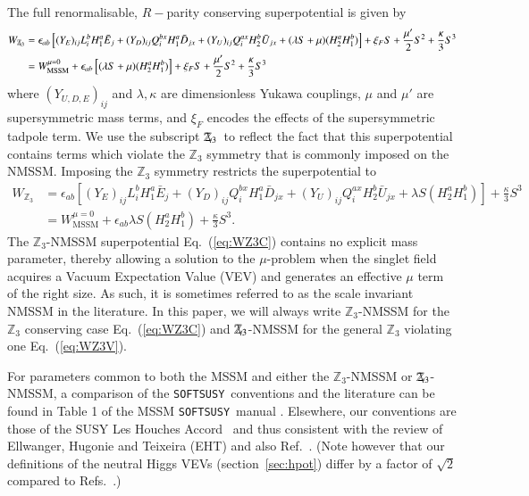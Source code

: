 \documentclass[final,3p,times]{elsarticle}
\def\SOFTSUSY{{\tt SOFTSUSY}}
\newcommand{\Zv}{\,\mathbf{\backslash}\mkern-11.0mu{\mathbb{Z}}_{3}} %
\begin{document}
The full renormalisable, $R-$parity conserving superpotential is given by
%
\begin{align} 
 W_{\Zv}  &=  \epsilon_{ab} \left[ (Y_E)_{ij} L_i^b H_1^a \bar{E}_{j} 
+ (Y_D)_{ij} Q_i^{bx} H_1^a \bar{D}_{jx} 
+ (Y_U)_{ij} Q_i^{ax} H_2^b \bar{U}_{jx} 
+ (\lambda S + \mu)(H^a_2 H^b_1) \right]  + \xi_FS 
+ \frac{\mu^\prime}{2} S^{2} + \frac{\kappa}{3}S^{3} \\
%
&= W_\mathrm{MSSM}^{\mu =0} 
+ \epsilon_{ab}\left[ (\lambda S + \mu)(H^a_2 H^b_1) \right]  
+ \xi_FS + \frac{\mu^\prime}{2}S^{2} + \frac{\kappa}{3} S^{3} \,
\label{eq:WZ3V}
\end{align}
%
\noindent where $(Y_{U,D,E})_{ij}$ and $\lambda,\kappa$ are dimensionless Yukawa 
couplings, $\mu$ and $\mu'$ are supersymmetric mass terms, and $\xi_F$ encodes 
the effects of the supersymmetric tadpole term.  We use
the subscript $\Zv$~to reflect the fact that this superpotential 
contains terms which violate the $\mathbb{Z}_3$ symmetry that is commonly 
imposed on the NMSSM.  Imposing the $\mathbb{Z}_3$ symmetry restricts the 
superpotential to
%
\begin{align} 
 W_{\mathbb{Z}_3} &= \epsilon_{ab} \left[(Y_E)_{ij} L_i^b H_1^a \bar{E}_{j} 
+ (Y_D)_{ij} Q_i^{bx} H_1^a \bar{D}_{jx} + (Y_U)_{ij} Q_i^{ax} H_2^b \bar{U}_{jx}  
+ \lambda S(H^a_2 H^b_1) \right] + \frac{\kappa}{3}S^{3} \\
%
&= W_\mathrm{MSSM}^{\mu =0}  + \epsilon_{ab} \lambda S (H^a_2 H^b_1) 
+ \frac{\kappa}{3}S^{3}.
\label{eq:WZ3C}
\end{align}
%
\noindent The $\mathbb{Z}_3$-NMSSM superpotential Eq.~(\ref{eq:WZ3C}) contains no 
explicit mass parameter, thereby allowing a solution to the $\mu$-problem when 
the singlet field acquires a Vacuum Expectation Value (VEV) and generates an 
effective $\mu$ term of the right size. As such, it is sometimes referred to as 
the scale invariant NMSSM in the literature.  In this paper, we will always 
write $\mathbb{Z}_3$-NMSSM for the $\mathbb{Z}_3$ conserving case 
Eq.~(\ref{eq:WZ3C}) and $\Zv$-NMSSM for the general $\mathbb{Z}_3$ violating one 
Eq.~(\ref{eq:WZ3V}). 

For parameters common to both the MSSM and either the $\mathbb{Z}_3$-NMSSM or 
$\Zv$-NMSSM, a comparison of the \SOFTSUSY~conventions and the literature can be 
found in Table 1 of the MSSM \SOFTSUSY~manual \cite{Allanach:2001kg}.  Elsewhere, 
our conventions are those of the SUSY Les Houches Accord~\cite{Allanach:2008qq} 
and thus consistent with the review of Ellwanger, Hugonie and Teixeira (EHT) 
 \cite{Ellwanger:2009dp} and also Ref.~\cite{Degrassi:2009yq}. (Note however that 
our definitions of the neutral Higgs VEVs (section~\ref{sec:hpot}) differ by a 
factor of $\sqrt{2}$ compared to Refs.~\cite{Ellwanger:2009dp,Degrassi:2009yq}.)
\end{document}
